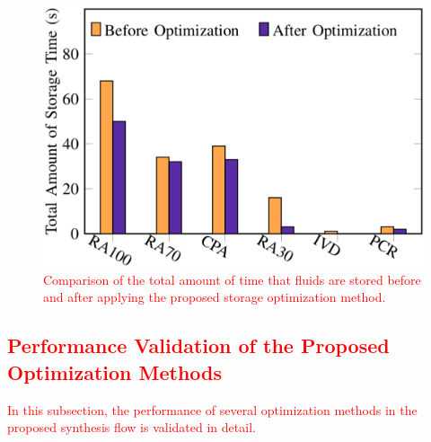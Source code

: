 \begin{figure}[t]
    \centering
    \includegraphics[width=0.85\linewidth]{Visio/storage_cmp.pdf}
  \caption{\textcolor{red}{Comparison of the total amount of time that fluids are stored before and after applying the proposed storage optimization method.}}
      \label{fig:storage_cmp}
\end{figure}




\subsection{\textcolor{red}{Performance Validation of the Proposed Optimization Methods}}

\textcolor{red}{In this subsection, the performance of several optimization methods in the proposed synthesis flow is validated in detail.}

